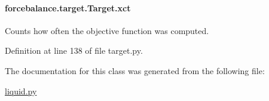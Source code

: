 \hypertarget{classforcebalance_1_1target_1_1Target_aad2e385cfbf7b4a68f1c2cb41133fe82}{
\paragraph[{xct}]{\setlength{\rightskip}{0pt plus 5cm}forcebalance.\-target.\-Target.\-xct\hspace{0.3cm}{\ttfamily [inherited]}}}\label{classforcebalance_1_1target_1_1Target_aad2e385cfbf7b4a68f1c2cb41133fe82}


Counts how often the objective function was computed. 



Definition at line 138 of file target.\-py.



The documentation for this class was generated from the following file\-:\begin{DoxyCompactItemize}
\item 
\hyperlink{liquid_8py}{liquid.\-py}\end{DoxyCompactItemize}
